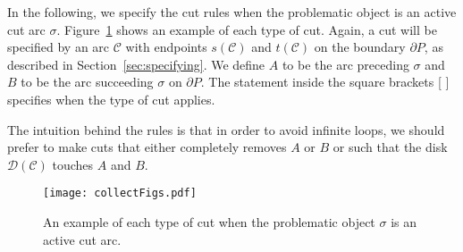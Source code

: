 \documentclass{article}
\newcommand{\PP}{P}
\newcommand{\se}{\sigma}
\newcommand{\cut}{\mathcal C}
\newcommand{\cutdisk}{\mathcal D}
\newcommand{\start}{s}
\newcommand{\terminal}{t}
\newcommand{\arcA}{A}
\newcommand{\arcB}{B}
\begin{document}
In the following, we specify the cut rules when the problematic object is an active cut arc $\se$.
Figure~\ref{fig:cuttypesActive} shows an example of each type of cut.
Again, a cut will be specified by an arc $\cut$ with endpoints $\start(\cut)$ and $\terminal(\cut)$ on the boundary $\partial\PP$, as described in Section~\ref{sec:specifying}.
We define $\arcA$ to be the arc preceding $\se$ and $\arcB$ to be the arc succeeding $\se$ on $\partial\PP$.
The statement inside the square brackets [ ] specifies when the type of cut applies.

The intuition behind the rules is that in order to avoid infinite loops, we should prefer to make cuts that either completely removes $\arcA$ or $\arcB$ or such that the disk $\cutdisk(\cut)$ touches $\arcA$ and $\arcB$.

\begin{figure}
\centering
\texttt{[image: collectFigs.pdf]}
\caption{An example of each type of cut when the problematic object $\se$ is an active cut arc.}
\label{fig:cuttypesActive}
\end{figure}
\end{document}
